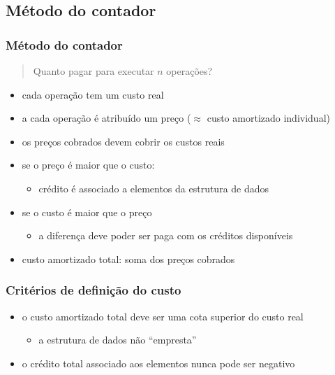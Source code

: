 \documentclass{beamer}
\begin{document}
\subsection{Método do contador}

\begin{frame}

\frametitle{Método do contador}

\begin{quote}
Quanto pagar para executar $n$ operações?
\end{quote}

\begin{itemize}

\item cada operação tem um custo real

\item a cada operação é atribuído um preço ($\approx$ custo amortizado individual)

\item os preços cobrados devem cobrir os custos reais

\item se o preço é maior que o custo:
\begin{itemize}
\item crédito é associado a elementos da estrutura de dados
\end{itemize}

\item se o custo é maior que o preço
\begin{itemize}
\item a diferença deve poder ser paga com os créditos disponíveis
\end{itemize}

\item custo amortizado total: soma dos preços cobrados
\end{itemize}

\end{frame}

\begin{frame}

\frametitle{Critérios de definição do custo}

\begin{itemize}

\item o custo amortizado total deve ser uma cota superior do custo real
\begin{itemize}
\item a estrutura de dados não ``empresta''
\end{itemize}

\item o crédito total associado aos elementos nunca pode ser negativo

\end{itemize}

\end{frame}
\end{document}
